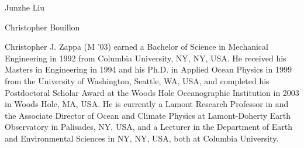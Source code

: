 \documentclass[letterpaper,journal]{IEEEtran}
\begin{document}
\begin{IEEEbiography}{Junzhe Liu}
\end{IEEEbiography}

\begin{IEEEbiography}{Christopher Bouillon}
\end{IEEEbiography}

\begin{IEEEbiography}{Christopher J. Zappa}
(M '03) earned a Bachelor of Science in Mechanical Engineering in 1992 from Columbia University, NY, NY, USA.  He received his Masters in Engineering in 1994 and his Ph.D. in Applied Ocean Physics in 1999 from the University of Washington, Seattle, WA, USA, and completed his Postdoctoral Scholar Award at the Woods Hole Oceanographic Institution in 2003 in Woods Hole, MA, USA. He is currently a Lamont Research Professor in and the Associate Director of Ocean and Climate Physics at Lamont-Doherty Earth Observatory in Palisades, NY, USA, and a Lecturer in the Department of Earth and Environmental Sciences in NY, NY, USA, both at Columbia University.
\end{IEEEbiography}
\end{document}
